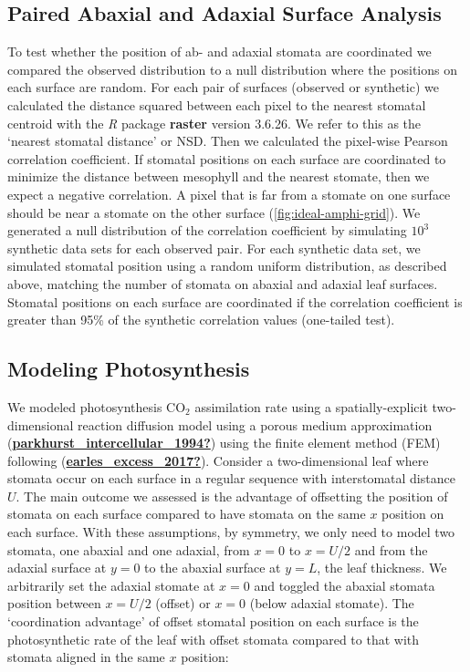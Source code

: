 \documentclass[12pt,halfline,a4paper,]{ouparticle}
\begin{document}
\hypertarget{paired-abaxial-and-adaxial-surface-analysis}{%
\subsection{Paired Abaxial and Adaxial Surface
Analysis}\label{paired-abaxial-and-adaxial-surface-analysis}}

To test whether the position of ab- and adaxial stomata are coordinated
we compared the observed distribution to a null distribution where the
positions on each surface are random. For each pair of surfaces
(observed or synthetic) we calculated the distance squared between each
pixel to the nearest stomatal centroid with the \emph{R} package
\textbf{raster} version 3.6.26. We refer to this as the `nearest
stomatal distance' or NSD. Then we calculated the pixel-wise Pearson
correlation coefficient. If stomatal positions on each surface are
coordinated to minimize the distance between mesophyll and the nearest
stomate, then we expect a negative correlation. A pixel that is far from
a stomate on one surface should be near a stomate on the other surface
(\autoref{fig:ideal-amphi-grid}). We generated a null distribution of
the correlation coefficient by simulating \(10^3\) synthetic data sets
for each observed pair. For each synthetic data set, we simulated
stomatal position using a random uniform distribution, as described
above, matching the number of stomata on abaxial and adaxial leaf
surfaces. Stomatal positions on each surface are coordinated if the
correlation coefficient is greater than 95\% of the synthetic
correlation values (one-tailed test).

\hypertarget{modeling-photosynthesis}{%
\subsection{Modeling Photosynthesis}\label{modeling-photosynthesis}}

We modeled photosynthesis CO\(_2\) assimilation rate using a
spatially-explicit two-dimensional reaction diffusion model using a
porous medium approximation
(\protect\hyperlink{ref-parkhurst_intercellular_1994}{\textbf{parkhurst\_intercellular\_1994?}})
using the finite element method (FEM) following
(\protect\hyperlink{ref-earles_excess_2017}{\textbf{earles\_excess\_2017?}}).
Consider a two-dimensional leaf where stomata occur on each surface in a
regular sequence with interstomatal distance \(U\). The main outcome we
assessed is the advantage of offsetting the position of stomata on each
surface compared to have stomata on the same \(x\) position on each
surface. With these assumptions, by symmetry, we only need to model two
stomata, one abaxial and one adaxial, from \(x = 0\) to \(x = U/2\) and
from the adaxial surface at \(y = 0\) to the abaxial surface at
\(y = L\), the leaf thickness. We arbitrarily set the adaxial stomate at
\(x = 0\) and toggled the abaxial stomata position between \(x = U/2\)
(offset) or \(x = 0\) (below adaxial stomate). The `coordination
advantage' of offset stomatal position on each surface is the
photosynthetic rate of the leaf with offset stomata compared to that
with stomata aligned in the same \(x\) position:
\end{document}
